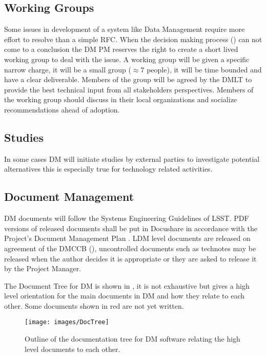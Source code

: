 \subsection {Working Groups } \label{sect:wgs}
Some issues in development of a system like Data Management require more effort to resolve than a simple RFC. When the decision making process () can not come to a conclusion the DM PM reserves the right to create
 a short lived working group to deal with the issue. A working group will be given a specific narrow charge, it will be a small group ($\approx 7$ people), it will be time bounded and have a clear deliverable. 
 Members of the group will be agreed by the DMLT to provide the best technical input from all stakeholders perspectives. Members of the working group should discuss in their local organizations and socialize recommendations ahead of adoption. 

 \subsection {Studies } \label{sect:studies}
 In some cases DM will initiate studies by external parties to investigate potential alternatives this is especially
  true for technology related activities. 



\subsection {Document Management} \label{sect:docman}

DM documents will follow the Systems Engineering Guidelines of LSST. PDF versions of released documents shall be put in Docushare in accordance with the Project's Document Management Plan . LDM level documents are released on agreement of the DMCCB (), uncontrolled documents such as technotes may be released when the author decides it is appropriate or they are asked to release it by the Project Manager.

The Document Tree for DM is shown in , it is not exhaustive but gives a high level orientation for the main documents in DM and how they relate to each other. Some documents shown in red are not yet written.

\begin{figure}
\begin{center}
 \texttt{[image: images/DocTree]}
\caption{Outline of the documentation tree for DM software relating the high level documents to each other. \label{fig:doctree}}
\end{center}
\end{figure}

